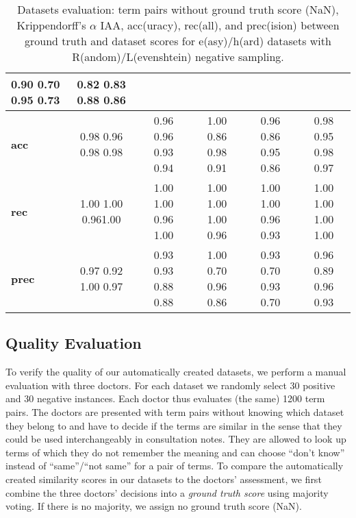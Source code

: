 \documentclass[letterpaper]{article} %
\begin{document}
\begin{table*}[t]
\begin{tabular}{l ccccc}
         0.90 \hfill 0.70 \hfill 0.95 \hfill 0.73 & 
         0.82 \hfill 0.83 \hfill 0.88 \hfill 0.86 \\ \midrule
         \textbf{acc} & 0.98 \hfill 0.96 \hfill 0.98 \hfill 0.98 &
         0.96 \hfill 0.96 \hfill 0.93 \hfill 0.94 & 
         1.00 \hfill 0.86 \hfill 0.98 \hfill 0.91& 
         0.96 \hfill 0.86 \hfill 0.95 \hfill 0.86& 
         0.98 \hfill 0.95 \hfill 0.98 \hfill 0.97\\
         \textbf{rec} & 1.00 \hfill 1.00 \hfill 0.96\hfill 1.00& 
         1.00 \hfill 1.00 \hfill 0.96 \hfill 1.00 & 
         1.00 \hfill 1.00 \hfill 1.00 \hfill 0.96 & 
         1.00 \hfill 1.00 \hfill 0.96 \hfill 0.93 & 
         1.00 \hfill 1.00 \hfill 1.00 \hfill 1.00 \\
         \textbf{prec} & 0.97 \hfill 0.92 \hfill 1.00 \hfill 0.97& 
         0.93 \hfill 0.93 \hfill 0.88 \hfill 0.88 & 
         1.00 \hfill 0.70 \hfill 0.96 \hfill 0.86 & 
         0.93 \hfill 0.70 \hfill 0.93 \hfill 0.70 & 
         0.96 \hfill 0.89 \hfill 0.96 \hfill 0.93 \\
         \bottomrule
    \end{tabular}
    \caption{Datasets evaluation: term pairs without ground truth score (NaN), Krippendorff's $\alpha$ IAA,
    acc(uracy), rec(all), and prec(ision) between ground truth and dataset scores for  e(asy)/h(ard) datasets with R(andom)/L(evenshtein) negative sampling.}
    \label{tab:datasets_evaluation}
\end{table*}

\subsection{Quality Evaluation}

To verify the quality of our automatically created datasets, we perform a manual evaluation with three doctors.
For each dataset we randomly select 30 positive and 30 negative instances.
Each doctor thus evaluates (the same) 1200 term pairs.
The doctors are presented with term pairs without knowing which dataset they belong to and have to decide if the terms are similar in the sense that they could be used interchangeably in consultation notes.
They are allowed to look up terms of which they do not remember the meaning and can choose ``don't know'' instead of ``same''/``not same'' for a pair of terms.
To compare the automatically created similarity scores in our datasets to the doctors' assessment, we first combine the three doctors' decisions into a \emph{ground truth score} using majority voting. If there is no majority, we assign no ground truth score (NaN).
\end{document}
